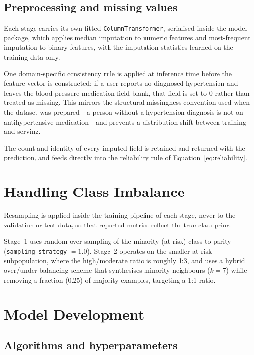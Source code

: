 \subsection{Preprocessing and missing values}

Each stage carries its own fitted \texttt{ColumnTransformer}, serialised inside
the model package, which applies median imputation to numeric features and
most-frequent imputation to binary features, with the imputation statistics
learned on the training data only.

One domain-specific consistency rule is applied at inference time before the
feature vector is constructed: if a user reports no diagnosed hypertension and
leaves the blood-pressure-medication field blank, that field is set to $0$
rather than treated as missing. This mirrors the structural-missingness
convention used when the dataset was prepared---a person without a hypertension
diagnosis is not on antihypertensive medication---and prevents a distribution
shift between training and serving.

The count and identity of every imputed field is retained and returned with the
prediction, and feeds directly into the reliability rule of
Equation~\ref{eq:reliability}.

\section{Handling Class Imbalance}
\label{sec:imbalance_method}

Resampling is applied inside the training pipeline of each stage, never to the
validation or test data, so that reported metrics reflect the true class prior.

Stage~1 uses random over-sampling of the minority (at-risk) class to parity
(\texttt{sampling\_strategy} $=1.0$). Stage~2 operates on the smaller at-risk
subpopulation, where the high/moderate ratio is roughly 1:3, and uses a hybrid
over/under-balancing scheme that synthesises minority neighbours
($k=7$) while removing a fraction (0.25) of majority examples, targeting a 1:1
ratio.

\section{Model Development}
\label{sec:model_dev}

\subsection{Algorithms and hyperparameters}

